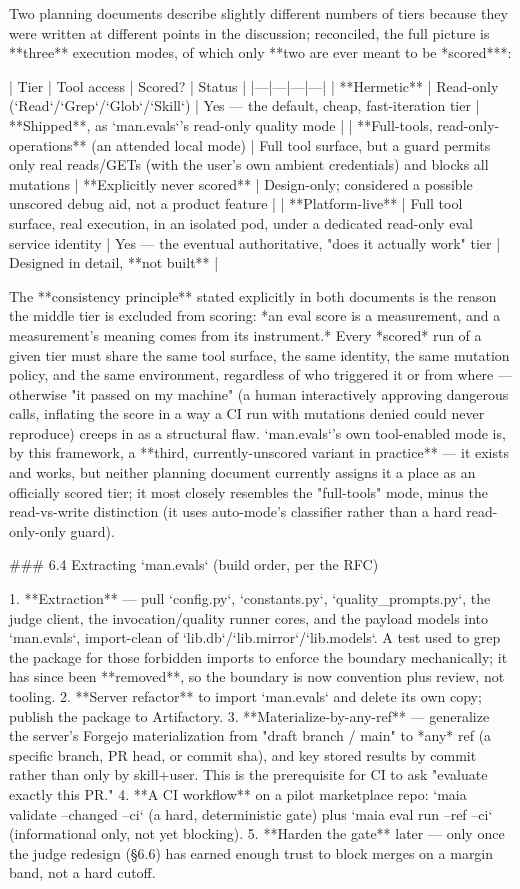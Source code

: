 Two planning documents describe slightly different numbers of tiers because they were written at different points in the discussion; reconciled, the full picture is **three** execution modes, of which only **two are ever meant to be *scored***:

| Tier | Tool access | Scored? | Status |
|---|---|---|---|
| **Hermetic** | Read-only (`Read`/`Grep`/`Glob`/`Skill`) | Yes — the default, cheap, fast-iteration tier | **Shipped**, as `man.evals`'s read-only quality mode |
| **Full-tools, read-only-operations** (an attended local mode) | Full tool surface, but a guard permits only real reads/GETs (with the user's own ambient credentials) and blocks all mutations | **Explicitly never scored** | Design-only; considered a possible unscored debug aid, not a product feature |
| **Platform-live** | Full tool surface, real execution, in an isolated pod, under a dedicated read-only eval service identity | Yes — the eventual authoritative, "does it actually work" tier | Designed in detail, **not built** |

The **consistency principle** stated explicitly in both documents is the reason the middle tier is excluded from scoring: *an eval score is a measurement, and a measurement's meaning comes from its instrument.* Every *scored* run of a given tier must share the same tool surface, the same identity, the same mutation policy, and the same environment, regardless of who triggered it or from where — otherwise "it passed on my machine" (a human interactively approving dangerous calls, inflating the score in a way a CI run with mutations denied could never reproduce) creeps in as a structural flaw. `man.evals`'s own tool-enabled mode is, by this framework, a **third, currently-unscored variant in practice** — it exists and works, but neither planning document currently assigns it a place as an officially scored tier; it most closely resembles the "full-tools" mode, minus the read-vs-write distinction (it uses auto-mode's classifier rather than a hard read-only-only guard).

### 6.4 Extracting `man.evals` (build order, per the RFC)

1. **Extraction** — pull `config.py`, `constants.py`, `quality_prompts.py`, the judge client, the invocation/quality runner cores, and the payload models into `man.evals`, import-clean of `lib.db`/`lib.mirror`/`lib.models`. A test used to grep the package for those forbidden imports to enforce the boundary mechanically; it has since been **removed**, so the boundary is now convention plus review, not tooling.
2. **Server refactor** to import `man.evals` and delete its own copy; publish the package to Artifactory.
3. **Materialize-by-any-ref** — generalize the server's Forgejo materialization from "draft branch / main" to *any* ref (a specific branch, PR head, or commit sha), and key stored results by commit rather than only by skill+user. This is the prerequisite for CI to ask "evaluate exactly this PR."
4. **A CI workflow** on a pilot marketplace repo: `maia validate --changed --ci` (a hard, deterministic gate) plus `maia eval run --ref --ci` (informational only, not yet blocking).
5. **Harden the gate** later — only once the judge redesign (§6.6) has earned enough trust to block merges on a margin band, not a hard cutoff.

